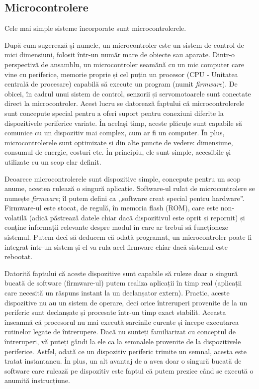 \subsection{Microcontrolere}
\label{sec:embed:micro-comp:micro}

Cele mai simple sisteme încorporate sunt microcontrolerele.

După cum sugerează și numele, un microcontroler este un sistem de control de
mici dimensiuni, folosit într-un număr mare de obiecte sau aparate. Dintr-o
perspectivă de ansamblu, un microcontroler seamănă cu un mic computer care vine
cu periferice, memorie proprie și cel puțin un procesor (CPU - Unitatea centrală
de procesare) capabilă să execute un program (numit \textit{firmware}). De obicei, în
cadrul unui sistem de control, senzorii și servomotoarele sunt conectate direct
la microcontroler. Acest lucru se datorează faptului că microcontrolerele sunt
concepute special pentru a oferi suport pentru conexiuni diferite la dispozitivele
periferice variate. În același timp, aceste plăcuțe sunt capabile să comunice cu
un dispozitiv mai complex, cum ar fi un computer. În plus, microcontrolerele
sunt optimizate și din alte puncte de vedere: dimensiune, consumul de energie,
costuri etc. În principiu, ele sunt simple, accesibile și utilizate cu un scop
clar definit.

Deoarece microcontrolerele sunt dispozitive simple, concepute pentru un scop
anume, acestea rulează o singură aplicație. Software-ul rulat de
microcontrolere se numește \textit{firmware}; îl putem defini ca ,,software creat special
pentru hardware''. Firmware-ul este stocat, de regulă, în memoria flash (ROM),
care este non-volatilă (adică păstrează datele chiar dacă dispozitivul este
oprit și repornit) și conține informații relevante despre modul în care ar
trebui să funcționeze sistemul. Putem deci să deducem că odată programat, un
microcontroler poate fi integrat într-un sistem și el va rula acel firmware
chiar dacă sistemul este rebootat.

Datorită faptului că aceste dispozitive sunt capabile să ruleze doar o singură
bucată de software (firmware-ul) putem realiza aplicații în timp real (aplicații
care necesită un răspuns instant la un declanșator extern). Practic, aceste
dispozitive nu au un sistem de operare, deci orice întreruperi provenite de la
un periferic sunt declanșate și procesate într-un timp exact stabilit. Aceasta
înseamnă că procesorul nu mai execută sarcinile curente și începe executarea
rutinelor legate de întrerupere. Dacă nu sunteți familiarizat cu conceptul de
întreruperi, vă puteți gândi la ele ca la semnalele provenite de la
dispozitivele periferice. Astfel, odată ce un dispozitiv periferic trimite un semnal,
acesta este tratat instantaneu. În plus, un alt avantaj de a avea doar o singură
bucată de software care rulează pe dispozitiv este faptul că putem prezice când
se execută o anumită instrucțiune.

